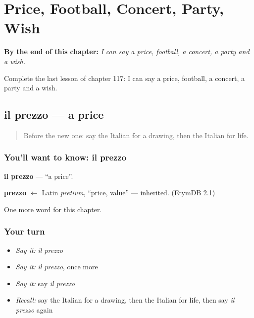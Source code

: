
\chapter{Price, Football, Concert, Party, Wish}
\label{ch:it-price-football-concert-party-wish}

\begin{chapteropening}
\textbf{By the end of this chapter:} \emph{I can say a price, football, a concert, a party and a wish.}

Complete the last lesson of chapter 117: I can say a price, football, a concert, a party and a wish.
\end{chapteropening}

\section[il prezzo]{il prezzo — a price}

\label{lesson:IT-C117-prezzo}



\begin{quote}
Before the new one: say the Italian for a drawing, then the Italian for life.
\end{quote}

\subsection*{You'll want to know: il prezzo}
\textbf{il prezzo} — \textquotedblleft{}a price\textquotedblright{}.

\begin{cousinweb}
\textbf{prezzo} $\leftarrow$ Latin \emph{pretium}, \textquotedblleft{}price, value\textquotedblright{} — inherited. (EtymDB 2.1)
\end{cousinweb}

\begin{grammarlens}[title={What you've built}]
One more word for this chapter.
\end{grammarlens}

\subsection*{Your turn}
\begin{itemize}
\raggedright
  \item \emph{Say it:} \emph{il prezzo}
  \item \emph{Say it:} \emph{il prezzo}, once more
  \item \emph{Say it:} say \emph{il prezzo}
  \item \emph{Recall:} say the Italian for a drawing, then the Italian for life, then say \emph{il prezzo} again
\end{itemize}

